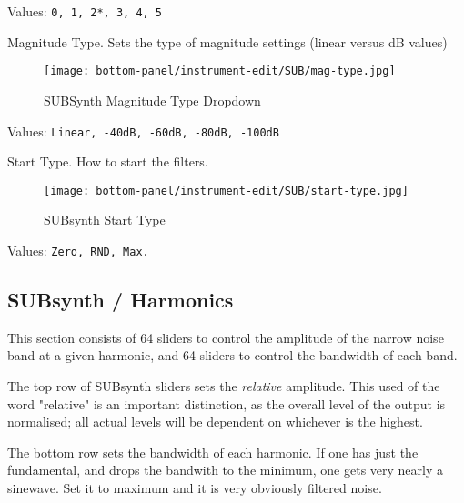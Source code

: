    Values: \texttt{0, 1, 2*, 3, 4, 5}

   Magnitude Type.
   Sets the type of magnitude settings (linear versus dB values) 

\begin{figure}[H]
   \centering 
   \texttt{[image: bottom-panel/instrument-edit/SUB/mag-type.jpg]}
   \caption{SUBSynth Magnitude Type Dropdown}
   \label{fig:subsynth_magnitude_type_dropdown}
\end{figure}

   Values: \texttt{Linear, -40dB, -60dB, -80dB, -100dB}

   Start Type.
   How to start the filters.

\begin{figure}[H]
   \centering 
   \texttt{[image: bottom-panel/instrument-edit/SUB/start-type.jpg]}
   \caption{SUBsynth Start Type}
   \label{fig:subsynth_start_type}
\end{figure}

   Values: \texttt{Zero, RND, Max.}

\subsection{SUBsynth / Harmonics}
\label{subsec:subsynth_harmonics}

   This section consists of 64 sliders to control the amplitude of the narrow
   noise band at a given harmonic, and 64 sliders to control the bandwidth of
   each band.

   The top row of SUBsynth sliders sets the \textsl{relative} amplitude.  This
   used of the word "relative" is an important distinction, as the overall level
   of the output is normalised; all actual levels will be dependent on whichever
   is the highest.

   The bottom row sets the bandwidth of each harmonic. If one has just the
   fundamental, and drops the bandwith to the minimum, one gets very nearly a
   sinewave.  Set it to maximum and it is very obviously filtered noise.


